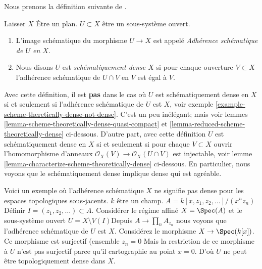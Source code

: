 \noindent
Nous prenons la définition suivante de \cite[IV, définition 11.10.2]{EGA}.

\begin{definition}

\label{definition-scheme-theoretically-dense}

Laisser $X$ Être un plan. $U \subset X$ être un sous-système ouvert.

\begin{enumerate}

\item L'image schématique du morphisme $U \to X$
est appelé {\it Adhérence schématique de $U$ en $X$}.
\item Nous disons $U$ est {\it schématiquement dense $X$} si pour chaque ouverture $V \subset X$ l'adhérence schématique de $U \cap V$ en $V$ est égal à $V$.

\end{enumerate}

\end{definition}

\noindent

Avec cette définition, il est {\bf pas} dans le cas où $U$ est schématiquement dense en $X$ si et seulement si l'adhérence schématique de $U$ est $X$, voir exemple \ref{example-scheme-theretically-dense-not-dense}. C'est un peu inélégant; mais voir lemmes \ref{lemma-scheme-theoretically-dense-quasi-compact} et
\ref{lemma-reduced-scheme-theoretically-dense}
ci-dessous. D'autre part, avec cette définition $U$ est schématiquement dense en $X$ si et seulement si pour chaque $V \subset X$ ouvrir l'homomorphisme d'anneaux
$\mathcal{O}_X(V) \to \mathcal{O}_X(U \cap V)$ est injectable, voir lemme \ref{lemma-characterize-scheme-theoretically-dense}
ci-dessous. En particulier, nous voyons que le schématiquement dense implique dense qui est agréable.

\begin{example}

\label{example-scheme-theretically-dense-not-dense}

Voici un exemple où l'adhérence schématique $X$ ne signifie pas dense pour les espaces topologiques sous-jacents. $k$ être un champ. $A = k[x, z_1, z_2, \ldots]/(x^n z_n)$
Définir $I = (z_1, z_2, \ldots) \subset A$. Considérer le régime affiné $X = \Spec(A)$ et le sous-système ouvert $U = X \setminus V(I)$Depuis $A \to \prod_n A_{z_n}$ nous voyons que l'adhérence schématique de $U$ est $X$. Considérez le morphisme
$X \to \Spec(k[x])$. Ce morphisme est surjectif (ensemble $z_n = 0$ Mais la restriction de ce morphisme à $U$ n'est pas surjectif parce qu'il cartographie au point $x = 0$. D'où $U$ ne peut être topologiquement dense dans $X$.

\end{example}

